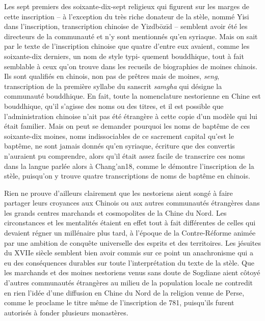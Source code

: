 Les sept premiers des soixante-dix-sept religieux qui figurent sur les
marges de cette inscription -- à l'exception du très riche donateur de
la stèle, nommé Yisi dans l'inscription, transcription chinoise de
Yizdbōzīd -- semblent avoir été les directeurs de la communauté et n'y
sont mentionnés qu'en syriaque. Mais on sait par le texte de
l'inscription chinoise que quatre d'entre eux avaient, comme les
soixante-dix derniers, un nom de style typi-
quement bouddhique, tout à fait semblable à ceux qu'on trouve dans les
recueils de biographies de moines chinois. Ils sont qualifiés en
chinois, non pas de prêtres mais de moines, \emph{seng}, transcription
de la première syllabe du sanscrit \emph{samgha} qui désigne la
communauté bouddhique. En fait, toute la nomenclature nestorienne en
Chine est bouddhique, qu'il s'agisse des noms ou des titres, et il est
possible que l'administration chinoise n'ait pas été étrangère à cette
copie d'un modèle qui lui était familier.
Mais on peut se demander pourquoi les noms de baptême de ces
soixante-dix moines, noms indissociables de ce sacrement capital qu'est
le baptême, ne sont jamais donnés qu'en syriaque, écriture que des
convertis n'auraient pu comprendre, alors qu'il était assez facile de
transcrire ces noms dans la langue parlée alors à Chang'an18, comme le
démontre l'inscription de la stèle, puisqu'on y trouve quatre
transcriptions de noms de baptême en chinois.

Rien ne prouve d'ailleurs clairement que les nestoriens aient songé à
faire partager leurs croyances aux Chinois ou aux autres communautés
étrangères dans les grands centres marchands et cosmopolites de la Chine
du Nord. Les circonstances et les mentalités étaient en effet tout à
fait différentes de celles qui devaient régner un millénaire plus tard,
à l'époque de la Contre-Réforme animée par une ambition de conquête
universelle des esprits et des territoires. Les jésuites du XVIIe siècle
semblent bien avoir commis sur ce point un anachronisme qui a eu des
conséquences durables sur toute l'interprétation du texte de la stèle.
Que les marchands et des moines nestoriens venus sans doute de Sogdiane aient côtoyé d'autres communautés étrangères au milieu de la
population locale ne contredit en rien l'idée d'une diffusion en Chine
du Nord de la religion venue de Perse, comme le proclame le titre même
de l'inscription de 781, puisqu'ils furent autorisés à fonder
plusieurs monastères.

